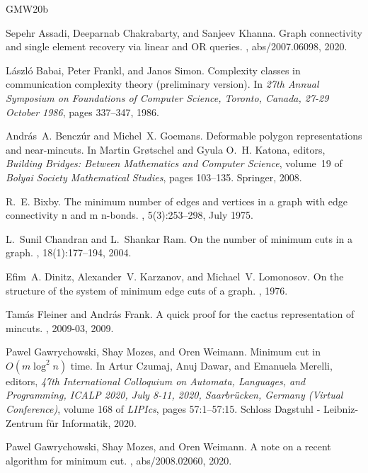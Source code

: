 \documentclass[10pt,a4paper]{article}
\newcommand{\1}{\mathbf{1}}
\theoremstyle{definition}
\begin{document}
\begin{thebibliography}{GMW20b}

Sepehr Assadi, Deeparnab Chakrabarty, and Sanjeev Khanna.
\newblock Graph connectivity and single element recovery via linear and {OR}
  queries.
, abs/2007.06098, 2020.

L{\'{a}}szl{\'{o}} Babai, Peter Frankl, and Janos Simon.
\newblock Complexity classes in communication complexity theory (preliminary
  version).
\newblock In {\em 27th Annual Symposium on Foundations of Computer Science,
  Toronto, Canada, 27-29 October 1986}, pages 337--347, 1986.

Andr{\'{a}}s~A. Bencz{\'{u}}r and Michel~X. Goemans.
\newblock Deformable polygon representations and near-mincuts.
\newblock In Martin Gr{\o}tschel and Gyula O.~H. Katona, editors, {\em Building
  Bridges: Between Mathematics and Computer Science}, volume~19 of {\em Bolyai
  Society Mathematical Studies}, pages 103--135. Springer, 2008.

R.~E. Bixby.
\newblock The minimum number of edges and vertices in a graph with edge
  connectivity n and m n-bonds.
, 5(3):253–298, July 1975.

L.~Sunil Chandran and L.~Shankar Ram.
\newblock On the number of minimum cuts in a graph.
, 18(1):177--194, 2004.

Efim~A. Dinitz, Alexander~V. Karzanov, and Michael~V. Lomonosov.
\newblock On the structure of the system of minimum edge cuts of a graph.
, 1976.

Tam{\'{a}}s Fleiner and Andr{\'{a}}s Frank.
\newblock A quick proof for the cactus representation of mincuts.
, 2009-03, 2009.

Pawel Gawrychowski, Shay Mozes, and Oren Weimann.
\newblock Minimum cut in ${O}(m \log^2 n)$ time.
\newblock In Artur Czumaj, Anuj Dawar, and Emanuela Merelli, editors, {\em 47th
  International Colloquium on Automata, Languages, and Programming, {ICALP}
  2020, July 8-11, 2020, Saarbr{\"{u}}cken, Germany (Virtual Conference)},
  volume 168 of {\em LIPIcs}, pages 57:1--57:15. Schloss Dagstuhl -
  Leibniz-Zentrum f{\"{u}}r Informatik, 2020.

Pawel Gawrychowski, Shay Mozes, and Oren Weimann.
\newblock A note on a recent algorithm for minimum cut.
, abs/2008.02060, 2020.


\end{thebibliography}
\end{document}
